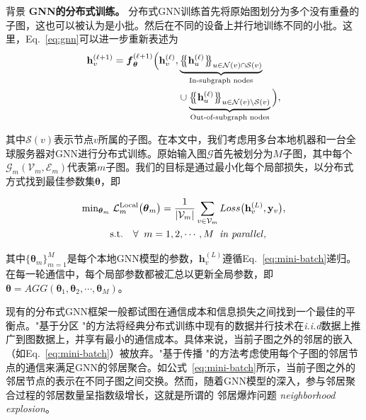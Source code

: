 \begin{section}{背景}
    \textbf{GNN的分布式训练。} 分布式GNN训练首先将原始图划分为多个没有重叠的子图，这也可以被认为是小批。然后在不同的设备上并行地训练不同的小批。这里，Eq.~\ref{eq:gnn}可以进一步重新表述为
    \begin{equation}
\label{eq:mini-batch}
\vspace{-1mm}
\begin{split}
    \mathbf{h}_{v}^{(\ell+1)} = \boldsymbol{f}_{\boldsymbol{\theta}}^{(\ell+1)} \Big( \mathbf{h}_{v}^{(\ell)}, 
    &\underbrace{\big\{\!\!\big\{\mathbf{h}^{(\ell)}_u \big\}\!\!\big\}_{u \in  \mathcal{N}(v)   \cap \mathcal{S}(v)}}_{\text{In-subgraph nodes}} \\ &\cup \underbrace{\big\{\!\!\big\{\mathbf{h}^{(\ell)}_u  \big\}\!\!\big\}_{u \in \mathcal{N}(v) \setminus \mathcal{S}(v)}}_{\text{Out-of-subgraph nodes}}  \Big),
\end{split}
\vspace{-1mm}
\end{equation}

其中$\mathcal{S}(v)$表示节点$v$所属的子图。在本文中，我们考虑用多台本地机器和一台全球服务器对GNN进行分布式训练。原始输入图$\mathcal{G}$首先被划分为$M$子图，其中每个$\mathcal{G}_{m}(\mathcal{V}_{m},\mathcal{E}_{m})$代表第$m$子图。我们的目标是通过最小化每个局部损失，以分布式方式找到最佳参数集$\boldsymbol{\theta}$，即

\begin{equation}
    \label{eq:distributed loss}
    \begin{split}
        \text{min}_{\boldsymbol{\theta}_{m}} & \;\mathcal{L}_{m}^{\text{Local}}\big(\boldsymbol{\theta}_{m}\big) = \frac{1}{\vert\mathcal{V}_m \vert}\sum_{v\in\mathcal{V}_m} Loss\big(\mathbf{h}_{v}^{(L)},\mathbf{y}_{v}\big), \\ & \text{s.t.}\quad\forall \;\;m=1,2,\cdots,M\;\; \text{\emph{in parallel}},
    \end{split}
\end{equation}

其中$\{\boldsymbol{\theta}_{m}\}_{m=1}^M$是每个本地GNN模型的参数，$\mathbf{h}_{v}^{(L)}$遵循Eq.~\ref{eq:mini-batch}递归。在每一轮通信中，每个局部参数都被汇总以更新全局参数，即$\boldsymbol{\theta}=AGG(\boldsymbol{\theta}_{1},\boldsymbol{\theta}_{2},\cdots,\boldsymbol{\theta}_{M})$。

现有的分布式GNN框架一般都试图在通信成本和信息损失之间找到一个最佳的平衡点。"基于分区 "的方法将经典分布式训练中现有的数据并行技术在\emph{i.i.d}数据上推广到图数据上，并享有最小的通信成本。具体来说，当前子图之外的邻居的嵌入（如Eq.~\ref{eq:mini-batch}）被放弃。"基于传播 "的方法考虑使用每个子图的邻居节点的通信来满足GNN的邻居聚合。如公式~\ref{eq:mini-batch}所示，当前子图之外的邻居节点的表示在不同子图之间交换。然而，随着GNN模型的深入，参与邻居聚合过程的邻居数量呈指数级增长，这就是所谓的 邻居爆炸问题 \emph{neighborhood explosion}。


\end{section}
